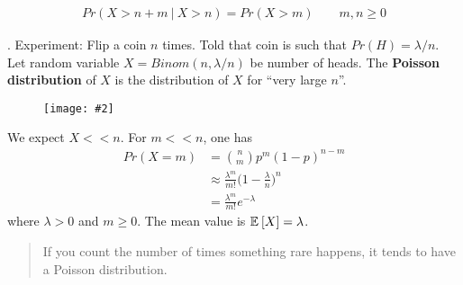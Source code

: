 \documentclass[12pt]{article}
\newcommand\myfig[2][0.3\textwidth]{\begin{figure}[h!]\centering\texttt{[image: \#2]}\end{figure}}
\newcommand{\myspace}{\vspace{2\bigskipamount}}
\newcommand\p{\Needspace{12\baselineskip} \noindent}
\begin{document}
\Theorem[Let $X$ be G(p). Then, for $n \ge 0$, $Pr(X > n) = (1 - p)^n$, and ]
\begin{align}
Pr( X > n + m ~ | ~ X > n) = Pr(X > m) \qquad m, n \ge 0
\end{align}

\myspace
\p {}. Experiment: Flip a coin $n$ times. Told that coin is such that $Pr(H) = \lambda/n$. Let random variable $X = Binom(n, \lambda/n)$ be number of heads. The \textbf{Poisson distribution} of $X$ is the distribution of $X$ for ``very large $n$''. 
\myfig{Poisson.PNG}

We expect $X << n$. For $m << n$, one has
\begin{align}
	Pr(X = m) &= \binom{n}{m} p^m (1 - p)^{n - m} \\
	&\approx \frac{\lambda^m}{m!} \bigg( 1 - \frac{\lambda}{n}\bigg)^n \\
	&= \frac{\lambda^m}{m!} e^{-\lambda}
\end{align}
where $\lambda > 0$ and $m \ge 0$. The mean value is $\mathbb{E}_{}\left[X\right] = \lambda$. 
\begin{quote}
		If you count the number of times something rare happens, it tends to have a Poisson distribution. 
\end{quote}
\end{document}

